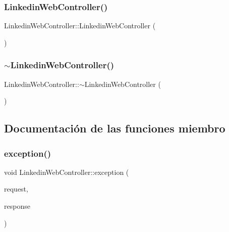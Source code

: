\subsubsection{\texorpdfstring{Linkedin\+Web\+Controller()}{LinkedinWebController()}}
{\footnotesize\ttfamily Linkedin\+Web\+Controller\+::\+Linkedin\+Web\+Controller (\begin{DoxyParamCaption}{ }\end{DoxyParamCaption})}

\mbox{\label{classLinkedinWebController_a9f795c0874b74594b8434317e2795e9a}} 
\subsubsection{\texorpdfstring{$\sim$\+Linkedin\+Web\+Controller()}{~LinkedinWebController()}}
{\footnotesize\ttfamily Linkedin\+Web\+Controller\+::$\sim$\+Linkedin\+Web\+Controller (\begin{DoxyParamCaption}{ }\end{DoxyParamCaption})}



\subsection{Documentación de las funciones miembro}
\mbox{\label{classLinkedinWebController_abe96bf2fa8e3084d45b34dda30331171}} 
\subsubsection{\texorpdfstring{exception()}{exception()}}
{\footnotesize\ttfamily void Linkedin\+Web\+Controller\+::exception (\begin{DoxyParamCaption}\item[{Mongoose\+::\+Request \&}]{request,  }\item[{Mongoose\+::\+Stream\+Response \&}]{response }\end{DoxyParamCaption})}

